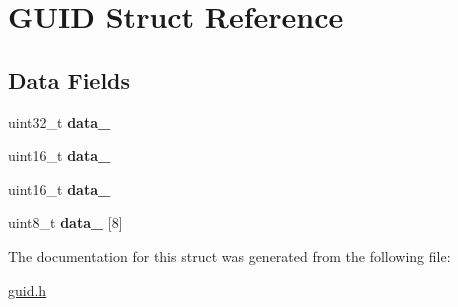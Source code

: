 \hypertarget{structGUID}{\section{G\-U\-I\-D Struct Reference}
\label{structGUID}
}
\subsection*{Data Fields}
\begin{DoxyCompactItemize}
\item 
\hypertarget{structGUID_a7dff10c0cb0848cd5c78fe9488043d75}{uint32\-\_\-t {\bfseries data\-\_}}\label{structGUID_a7dff10c0cb0848cd5c78fe9488043d75}

\item 
\hypertarget{structGUID_aa6d34ff395cb45b7cb34eab2a825f947}{uint16\-\_\-t {\bfseries data\-\_}}\label{structGUID_aa6d34ff395cb45b7cb34eab2a825f947}

\item 
\hypertarget{structGUID_a50150bee34224d64590ef7b110321e98}{uint16\-\_\-t {\bfseries data\-\_}}\label{structGUID_a50150bee34224d64590ef7b110321e98}

\item 
\hypertarget{structGUID_a30caf0c7f868c455e29584858892202a}{uint8\-\_\-t {\bfseries data\-\_} \mbox{[}8\mbox{]}}\label{structGUID_a30caf0c7f868c455e29584858892202a}

\end{DoxyCompactItemize}


The documentation for this struct was generated from the following file\-:\begin{DoxyCompactItemize}
\item 
\hyperlink{guid_8h}{guid.\-h}\end{DoxyCompactItemize}

